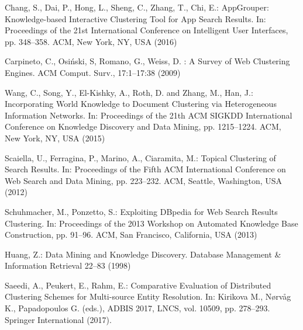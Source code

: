 \documentclass[runningheads]{llncs}
\begin{document}
\begin{thebibliography}{8}
Chang, S., Dai, P., Hong, L., Sheng, C., Zhang, T., Chi, E.: AppGrouper: Knowledge-based Interactive Clustering Tool for App Search Results. In: Proceedings of the 21st International Conference on Intelligent User Interfaces, pp. 348--358. ACM, New York, NY, USA (2016) 

Carpineto, C., Osi\'{n}ski, S, Romano, G., Weiss, D. : A Survey of Web Clustering Engines. ACM Comput. Surv., 17:1--17:38 (2009)

Wang, C., Song, Y., El-Kishky, A., Roth, D. and Zhang, M., Han, J.: Incorporating World Knowledge to Document Clustering via Heterogeneous Information Networks. In: Proceedings of the 21th ACM SIGKDD International Conference on Knowledge Discovery and Data Mining, pp. 1215--1224. ACM, New York, NY, USA (2015)

Scaiella, U., Ferragina, P., Marino, A., Ciaramita, M.: Topical Clustering of Search Results. In: Proceedings of the Fifth ACM International Conference on Web Search and Data Mining, pp. 223--232. ACM, Seattle, Washington, USA (2012) 

Schuhmacher, M., Ponzetto, S.: Exploiting DBpedia for Web Search Results Clustering. In: Proceedings of the 2013 Workshop on Automated Knowledge Base Construction, pp. 91--96. ACM, San Francisco, California, USA (2013) 

Huang, Z.: Data Mining and Knowledge Discovery. Database Management \& Information Retrieval 22--83 (1998)  

Saeedi, A., Peukert, E., Rahm, E.: Comparative Evaluation of Distributed Clustering Schemes for Multi-source Entity Resolution. In: Kirikova M., N\o rv\aa g K., Papadopoulos G. (eds.), ADBIS 2017, LNCS, vol. 10509, pp. 278--293. Springer International (2017). 

\end{thebibliography}

\begin{comment}
\bibitem{ref_lncs1}
Author, F., Author, S.: Title of a proceedings paper. In: Editor,
F., Editor, S. (eds.) CONFERENCE 2016, LNCS, vol. 9999, pp. 1--13.
Springer, Heidelberg (2016). \doi{10.10007/1234567890}

\bibitem{ref_article1}
Author, F.: Article title. Journal \textbf{2}(5), 99--110 (2016)

\bibitem{ref_book1}
Author, F., Author, S., Author, T.: Book title. 2nd edn. Publisher,
Location (1999)

\bibitem{ref_proc1}
Author, A.-B.: Contribution title. In: 9th International Proceedings
on Proceedings, pp. 1--2. Publisher, Location (2010)

\bibitem{ref_url1}
LNCS Homepage, \url{http://www.springer.com/lncs}. Last accessed 4
Oct 2017

\end{comment}
\end{document}
